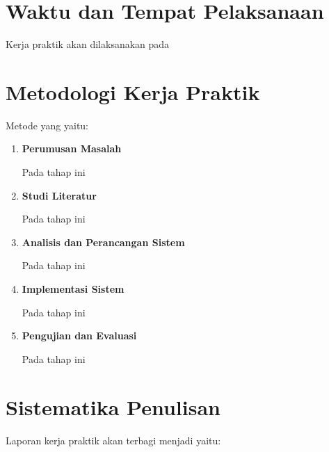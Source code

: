 \section{Waktu dan Tempat Pelaksanaan}

Kerja praktik akan dilaksanakan pada \lipsum[6][1-3]

\section{Metodologi Kerja Praktik}

Metode yang \lipsum[7][1-5] yaitu:

\begin{enumerate}[nolistsep]

  \item \textbf{Perumusan Masalah}

  Pada tahap ini \lipsum[7][6-9]

  \item \textbf{Studi Literatur}

  Pada tahap ini \lipsum[7][10-13]

  \item \textbf{Analisis dan Perancangan Sistem}

  Pada tahap ini \lipsum[8][1-2]

  \item \textbf{Implementasi Sistem}

  Pada tahap ini \lipsum[8][3-6]

  \item \textbf{Pengujian dan Evaluasi}

  Pada tahap ini \lipsum[8][7-12]

\end{enumerate}

\section{Sistematika Penulisan}

Laporan kerja praktik akan terbagi menjadi \lipsum[9][1] yaitu:

